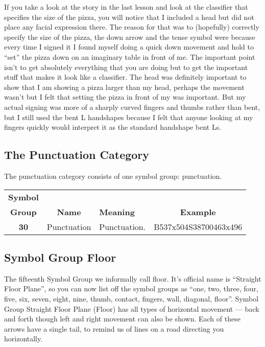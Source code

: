 \documentclass{article}
\begin{document}
If you take a look at the story in the last lesson and look at the classifier that specifies the size of the pizza, you will notice that I included a head but did not place any facial expression there.
The reason for that was to (hopefully) correctly specify the size of the pizza, the down arrow and the tense symbol were because every time I signed it I found myself doing a quick down movement and hold to ``set'' the pizza down on an imaginary table in front of me.
The important point isn't to get absolutely everything that you are doing but to get the important stuff that makes it look like a classifier.
The head was definitely important to show that I am showing a pizza larger than my head, perhaps the movement wasn't but I felt that setting the pizza in front of my was important.
But my actual signing was more of a sharply curved fingers and thumbs rather than bent, but I still used the bent L handshapes because I felt that anyone looking at my fingers quickly would interpret it as the standard handshape bent Ls.

\subsection{The Punctuation Category}

The punctuation category consists of one symbol group: punctuation.

\begin{center}
\begin{tabular}{ccp{21mm}c}
\textbf{Symbol}\\
\textbf{Group}&\textbf{Name}&\textbf{Meaning}&\textbf{Example}\\
\textbf{30}&Punctuation&Punctuation.&B537x504S38700463x496\\
\end{tabular}
\end{center}

\subsection{Symbol Group Floor}

The fifteenth Symbol Group we informally call floor.
It's official name is ``Straight Floor Plane'', so you can now list off the symbol groups as ``one, two, three, four, five, six, seven, eight, nine, thumb, contact, fingers, wall, diagonal, floor''.
Symbol Group Straight Floor Plane (Floor) has all types of horizontal movement --- back and forth though left and right movement can also be shown.
Each of these arrows have a single tail, to remind us of lines on a road directing you horizontally.
\end{document}
